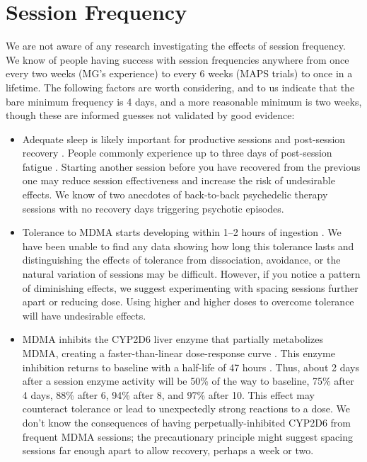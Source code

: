 \documentclass[12pt,letterpaper]{book}
\begin{document}
\section{Session Frequency}
\label{frequency}
We are not aware of any research investigating the effects of session frequency. We know of people having success with session frequencies anywhere from once every two weeks (MG's experience) to every 6 weeks (MAPS trials) to once in a lifetime. The following factors are worth considering, and to us indicate that the bare minimum frequency is 4 days, and a more reasonable minimum is two weeks, though these are informed guesses not validated by good evidence:
\begin{itemize}
    \item Adequate sleep is likely important for productive sessions and post-session recovery \cite{simon2020sleep}. People commonly experience up to three days of post-session fatigue \cite{liechtiGender}. Starting another session before you have recovered from the previous one may reduce session effectiveness and increase the risk of undesirable effects. We know of two anecdotes of back-to-back psychedelic therapy sessions with no recovery days triggering psychotic episodes. 
    \item Tolerance to MDMA starts developing within 1–2 hours of ingestion \cite{farreTolerance,parrottTolerance}. We have been unable to find any data showing how long this tolerance lasts and distinguishing the effects of tolerance from dissociation, avoidance, or the natural variation of sessions may be difficult. However, if you notice a pattern of diminishing effects, we suggest experimenting with spacing sessions further apart or reducing dose. Using higher and higher doses to overcome tolerance will have undesirable effects.
    \item MDMA inhibits the CYP2D6 liver enzyme that partially metabolizes MDMA, creating a faster-than-linear dose-response curve \cite{de2000nonlinear}. This enzyme inhibition returns to baseline with a half-life of 47 hours \cite{omathunaCYP}. Thus, about 2 days after a session enzyme activity will be 50\% of the way to baseline, 75\% after 4 days, 88\% after 6, 94\% after 8, and 97\% after 10. This effect may counteract tolerance or lead to unexpectedly strong reactions to a dose. We don't know the consequences of having perpetually-inhibited CYP2D6 from frequent MDMA sessions; the precautionary principle might suggest spacing sessions far enough apart to allow recovery, perhaps a week or two.

\end{itemize}
\end{document}
